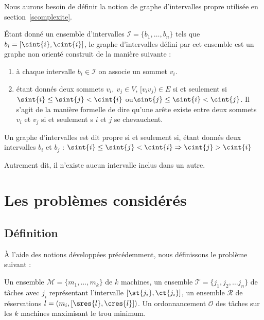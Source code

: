 \documentclass[a4paper,9pt]{book}
\begin{document}
Nous aurons besoin de définir la notion de graphe d'intervalles propre utilisée en
section~\ref{scomplexite}.

\begin{ndf}
    Étant donné un ensemble d'intervalles $\mathcal{I} = \{b_1, \dots, b_n\}$ tels que $b_i = [\sint{i},
    \cint{i}]$, le graphe d'intervalles défini par cet ensemble est un graphe non orienté construit de la
    manière suivante :
    \begin{enumerate}
        \item à chaque intervalle $b_i \in \mathcal{I}$ on associe un sommet $v_i$.
        \item étant donnés deux sommets $v_i,\ v_j \in V$, $[v_iv_j) \in E$ si et seulement si 
            $\sint{i} \leq \sint{j} < \cint{i}$ ou$\sint{j} \leq \sint{i} < \cint{j}$. Il s'agit
            de la manière formelle de dire qu'une arête existe entre deux sommets $v_i$ et $v_j$ si
            et seulement s $i$ et $j$ se chevauchent.
    \end{enumerate}

    Un graphe d'intervalles est dit propre si et seulement si, étant donnés deux intervalles $b_i$
    et $b_j$ : $\sint{i} \leq \sint{j} < \cint{i} \Rightarrow \cint{j} > \cint{i}$

    Autrement dit, il n'existe aucun intervalle inclus dans un autre.
\end{ndf}

\section{Les problèmes considérés}

\subsection{Définition}

À l'aide des notions développées précédemment, nous définissons le problème suivant :

\dfopt{\fisched}
{Un ensemble $\mathcal{M} = \{m_1, \dots, m_k\}$ de $k$ machines, un ensemble $\mathcal{T} = \{j_1,
    j_2, \dots j_n\}$ de tâches avec $j_i$ représentant l'intervalle $[\st{j_i}, \ct{j_i}]$, un
ensemble $\mathcal{R}$ de réservations $l = (m_i, [\sres{l}, \cres{l}])$.} 
{Un ordonnancement $\mathcal{O}$ des tâches sur les $k$ machines maximisant le trou
minimum.}
\end{document}
